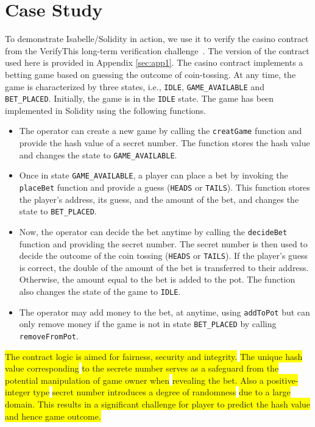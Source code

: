 \documentclass[a4paper,UKenglish,cleveref, autoref, thm-restate]{oasics-v2021}
\begin{document}
\section{Case Study}
To demonstrate Isabelle/Solidity in action, we use it to verify the casino contract from the VerifyThis long-term verification challenge~\cite{verifythis:casino}.
The version of the contract used here is provided in Appendix \ref{sec:app1}.
%
The casino contract implements a betting game based on guessing the outcome of coin-tossing.
%
At any time, the game is characterized by three states, i.e., \texttt{IDLE}, \texttt{GAME\_AVAILABLE} and \texttt{BET\_PLACED}.
%
Initially, the game is in the \texttt{IDLE} state.
%
The game has been implemented in Solidity using the following functions.
%
\begin{itemize}
\item The operator can create a new game by calling the \texttt{creatGame} function and provide the hash value of a secret number. 
The function stores the hash value and changes the state to \texttt{GAME\_AVAILABLE}.
%
\item Once in state \texttt{GAME\_AVAILABLE}, a player can place a bet by invoking the \texttt{placeBet} function and provide a guess (\texttt{HEADS} or \texttt{TAILS}).
This function stores the player's address, its guess, and the amount of the bet, and changes the state to \texttt{BET\_PLACED}.
%
\item Now, the operator can decide the bet anytime by calling the \texttt{decideBet} function and providing the secret number.
The secret number is then used to decide the outcome of the coin tossing (\texttt{HEADS} or \texttt{TAILS}).
If the player's guess is correct, the double of the amount of the bet is transferred to their address.
Otherwise, the amount equal to the bet is added to the pot.
The function also changes the state of the game to \texttt{IDLE}.
%
\item The operator may add money to the bet, at anytime, using \texttt{addToPot} but can only remove money if the game is not in state \texttt{BET\_PLACED} by calling \texttt{removeFromPot}.
\end{itemize}
%
\colorbox{yellow}{The contract logic is aimed for fairness, security and integrity.} 
%
\colorbox{yellow}{The unique hash value corresponding} \colorbox{yellow}{to the secrete number serves as a safeguard from the potential manipulation of game owner when} \colorbox{yellow}{revealing the bet.
%
Also a positive-integer type} \colorbox{yellow}{secret number introduces a degree of randomness} \colorbox{yellow}{due to a large domain. 
This results 
in a significant challenge for player to predict the hash value} \colorbox{yellow}{ and hence game outcome.}
%
%
\end{document}
